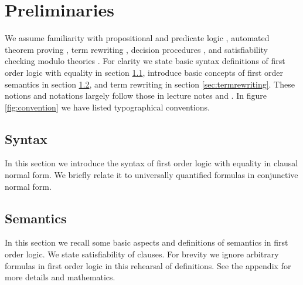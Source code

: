 
\chapter{Preliminaries}



We assume familiarity with propositional and predicate logic \cite{Huth:2004:LCS:975331}, 
automated theorem proving \cite{Fitting:1996:FLA:230183}, 
term rewriting \cite{Baader:1998:TR:280474}, 
decision procedures \cite{Kroening:2008:DPA:1391237}, 
and satisfiability checking modulo theories \cite{Biere:2009:HSV:1550723}.
For clarity we state basic syntax definitions of first order logic with equality in section \ref{sec:syntax},
introduce basic concepts of first order semantics in section \ref{sec:semantics},
and term rewriting in section \ref{sec:termrewriting}. 
These notions and notations largely follow those in lecture notes \cite{AM2015tr} and \cite{GM2013ar}.
In figure \ref{fig:convention} we have listed typographical conventions.


\section{Syntax}\label{sec:syntax}

In this section we introduce the syntax of first order logic with equality in clausal normal form.
We briefly relate it to universally quantified formulas in conjunctive normal form.

















\section{Semantics}\label{sec:semantics}

In this section we recall some basic aspects and definitions of semantics in first order logic. 
We state satisfiability of clauses. For brevity we ignore arbitrary formulas in first order logic
in this rehearsal of definitions. See the appendix for more details and mathematics.

